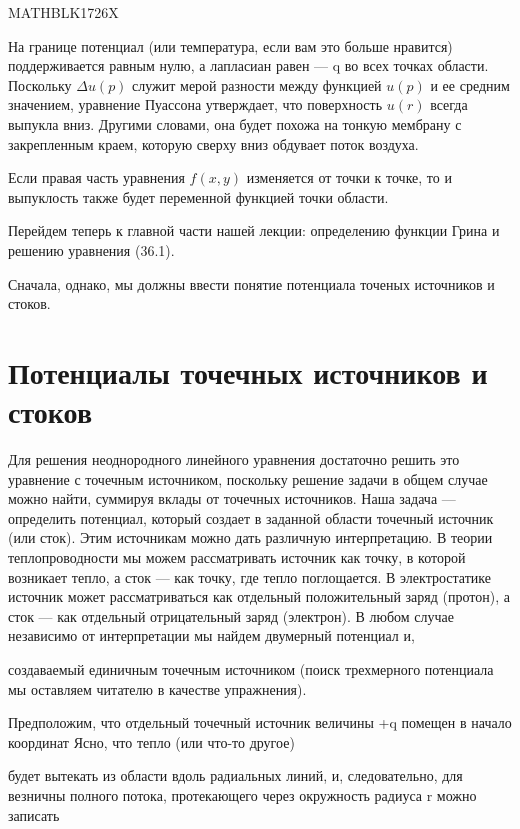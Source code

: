 \documentclass[
]{article}
\begin{document}
MATHBLK1726X

На границе потенциал (или температура, если вам это больше нравится)
поддерживается равным нулю, а лапласиан равен --- q во всех точках
области. Поскольку \(\Delta u\left(p\right)\) служит мерой разности
между функцией \(u\left(p\right)\) и ее средним значением, уравнение
Пуассона утверждает, что поверхность \(u\left(r\right)\) всегда выпукла
вниз. Другими словами, она будет похожа на тонкую мембрану с
закрепленным краем, которую сверху вниз обдувает поток воздуха.

Если правая часть уравнения \(f(x, y)\) изменяется от точки к точке, то
и выпуклость также будет переменной функцией точки области.

Перейдем теперь к главной части нашей лекции: определению функции Грина
и решению уравнения (36.1).

Сначала, однако, мы должны ввести понятие потенциала точеных источников
и стоков.

\section{Потенциалы точечных источников и
стоков}\label{ux43fux43eux442ux435ux43dux446ux438ux430ux43bux44b-ux442ux43eux447ux435ux447ux43dux44bux445-ux438ux441ux442ux43eux447ux43dux438ux43aux43eux432-ux438-ux441ux442ux43eux43aux43eux432}

Для решения неоднородного линейного уравнения достаточно решить это
уравнение с точечным источником, поскольку решение задачи в общем случае
можно найти, суммируя вклады от точечных источников. Наша задача ---
определить потенциал, который создает в заданной области точечный
источник (или сток). Этим источникам можно дать различную интерпретацию.
В теории теплопроводности мы можем рассматривать источник как точку, в
которой возникает тепло, а сток --- как точку, где тепло поглощается. В
электростатике источник может рассматриваться как отдельный
положительный заряд (протон), а сток --- как отдельный отрицательный
заряд (электрон). В любом случае независимо от интерпретации мы найдем
двумерный потенциал и,

создаваемый единичным точечным источником (поиск трехмерного потенциала
мы оставляем читателю в качестве упражнения).

Предположим, что отдельный точечный источник величины +q помещен в
начало координат Ясно, что тепло (или что-то другое)

будет вытекать из области вдоль радиальных линий, и, следовательно, для
везничны полного потока, протекающего через окружность радиуса r можно
записать
\end{document}
